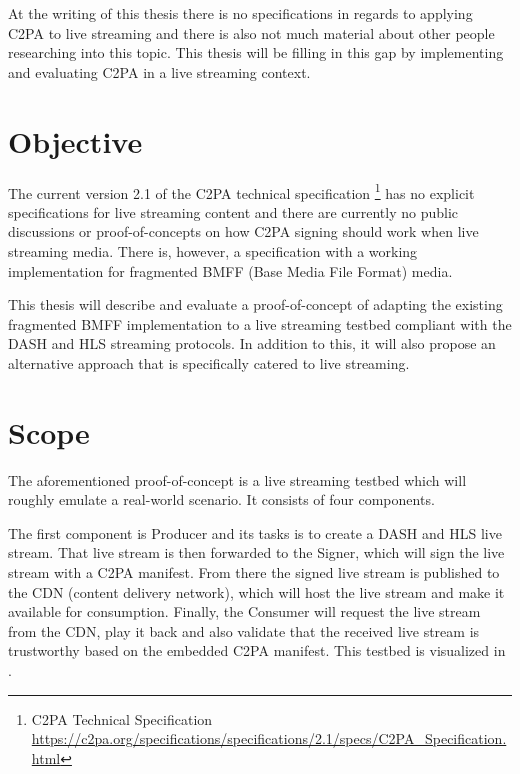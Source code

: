 At the writing of this thesis there is no specifications in regards to applying C2PA to live streaming and there is also not much material about other people researching into this topic. This thesis will be filling in this gap by implementing and evaluating C2PA in a live streaming context.

\section{Objective\label{sec:objective}}

The current version 2.1 of the C2PA technical specification \footnote{C2PA Technical Specification \url{https://c2pa.org/specifications/specifications/2.1/specs/C2PA_Specification.html}} has no explicit specifications for live streaming content and there are currently no public discussions or proof-of-concepts on how C2PA signing should work when live streaming media. There is, however, a specification with a working implementation for fragmented BMFF (Base Media File Format) media.

This thesis will describe and evaluate a proof-of-concept of adapting the existing fragmented BMFF implementation to a live streaming testbed compliant with the DASH and HLS streaming protocols. In addition to this, it will also propose an alternative approach that is specifically catered to live streaming.

\section{Scope\label{sec:scope}}

The aforementioned proof-of-concept is a live streaming testbed which will roughly emulate a real-world scenario. It consists of four components.

The first component is Producer and its tasks is to create a DASH and HLS live stream. That live stream is then forwarded to the Signer, which will sign the live stream with a C2PA manifest. From there the signed live stream is published to the CDN (content delivery network), which will host the live stream and make it available for consumption. Finally, the Consumer will request the live stream from the CDN, play it back and also validate that the received live stream is trustworthy based on the embedded C2PA manifest. This testbed is visualized in .

